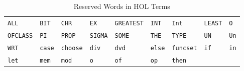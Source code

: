 

\begin{table}[htbp]
\begin{center}
\begin{tabular}{@{}|lllllllll|@{}}
\hline
\texttt{ALL} &
\texttt{BIT} &
\texttt{CHR} &
\texttt{EX} &
\texttt{GREATEST} &
\texttt{INT} &
\texttt{Int} &
\texttt{LEAST} &
\texttt{O} \\
\texttt{OFCLASS} &
\texttt{PI} &
\texttt{PROP} &
\texttt{SIGMA} &
\texttt{SOME} &
\texttt{THE} &
\texttt{TYPE} &
\texttt{UN} &
\texttt{Un} \\
\texttt{WRT} &
\texttt{case} &
\texttt{choose} &
\texttt{div} &
\texttt{dvd} &
\texttt{else} &
\texttt{funcset} &
\texttt{if} &
\texttt{in} \\
\texttt{let} &
\texttt{mem} &
\texttt{mod} &
\texttt{o} &
\texttt{of} &
\texttt{op} &
\texttt{then} &&\\
\hline
\end{tabular}
\end{center}
\caption{Reserved Words in HOL Terms}
\label{tab:ReservedWords}
\end{table}


